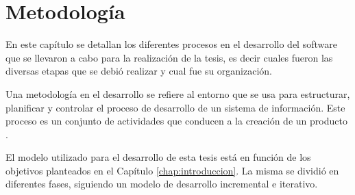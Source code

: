 \chapter{Metodología}\label{chap:metodologia}
En este capítulo se detallan los diferentes procesos en el desarrollo del software que se llevaron a cabo para la realización de la tesis, es decir cuales fueron las diversas etapas que se debió realizar y cual fue su organización.

\begin{center}
\begin{minipage}{0.8\linewidth}  \vspace{5pt} {\small
Una metodología en el desarrollo se refiere al entorno que se usa para estructurar, planificar y controlar el proceso de desarrollo de un sistema de información. Este proceso es un conjunto de actividades que conducen a la creación de un producto .}
\begin{flushright}
  \citep{sommerville}
\end{flushright}
\end{minipage}
\end{center}

El modelo utilizado para el desarrollo de esta tesis está en función de los objetivos planteados en el Capítulo \ref{chap:introduccion}. La misma se dividió en diferentes fases, siguiendo un modelo de desarrollo incremental e iterativo.


